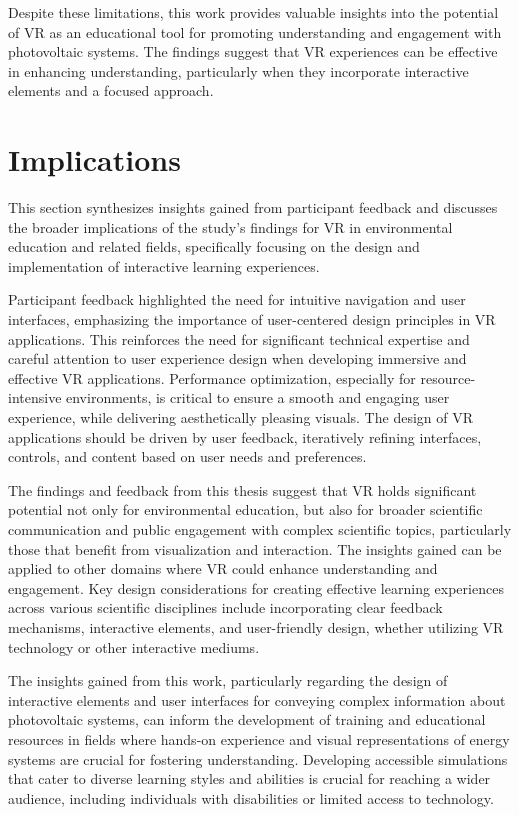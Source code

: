 \documentclass[draft, final]{vutinfth} %
\begin{document}
Despite these limitations, this work provides valuable insights into the potential of VR as an educational tool for promoting understanding and engagement with photovoltaic systems. The findings suggest that VR experiences can be effective in enhancing understanding, particularly when they incorporate interactive elements and a focused approach.

\section{Implications}
This section synthesizes insights gained from participant feedback and discusses the broader implications of the study's findings for VR in environmental education and related fields, specifically focusing on the design and implementation of interactive learning experiences.

Participant feedback highlighted the need for intuitive navigation and user interfaces, emphasizing the importance of user-centered design principles in VR applications. This reinforces the need for significant technical expertise and careful attention to user experience design when developing immersive and effective VR applications. Performance optimization, especially for resource-intensive environments, is critical to ensure a smooth and engaging user experience, while delivering aesthetically pleasing visuals. The design of VR applications should be driven by user feedback, iteratively refining interfaces, controls, and content based on user needs and preferences.

The findings and feedback from this thesis suggest that VR holds significant potential not only for environmental education, but also for broader scientific communication and public engagement with complex scientific topics, particularly those that benefit from visualization and interaction. The insights gained can be applied to other domains where VR could enhance understanding and engagement. Key design considerations for creating effective learning experiences across various scientific disciplines include incorporating clear feedback mechanisms, interactive elements, and user-friendly design, whether utilizing VR technology or other interactive mediums.  

The insights gained from this work, particularly regarding the design of interactive elements and user interfaces for conveying complex information about photovoltaic systems, can inform the development of training and educational resources in fields where hands-on experience and visual representations of energy systems are crucial for fostering understanding. Developing accessible simulations that cater to diverse learning styles and abilities is crucial for reaching a wider audience, including individuals with disabilities or limited access to technology. 
\end{document}

